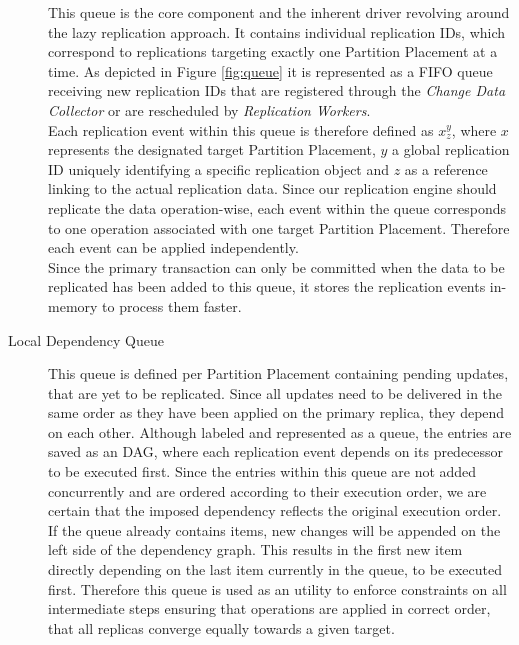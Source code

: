 \begin{description}
    This queue is the core component and the inherent driver revolving around the lazy replication approach. 
    It contains individual replication IDs, which correspond to replications targeting exactly one Partition Placement at a time.
    As depicted in Figure \ref{fig:queue} it is represented as a FIFO queue receiving new replication IDs that are registered through the \emph{Change Data Collector} 
    or are rescheduled by \emph{Replication Workers}.\\
    Each replication event within this queue is therefore defined as $x_{z}^y$, where $x$ represents the designated target Partition Placement, $y$ a global
    replication ID uniquely identifying a specific replication object and $z$ as a reference linking to the actual replication data. 
    Since our replication engine should replicate the data operation-wise, each event within the queue corresponds to one operation associated with one target Partition Placement.
    Therefore each event can be applied independently.\\Since the primary transaction can only be committed when the data to be replicated has been added to this queue,
    it stores the replication events in-memory to process them faster.

  
    \item[Local Dependency Queue] This queue is defined per Partition Placement containing pending updates, that are yet to be replicated. 
    Since all updates need to be delivered in the same order as they have been applied on the primary replica, they depend on each other. 
    Although labeled and represented as a queue, the entries are saved as an DAG, where each replication event depends on its predecessor to be executed first.
    Since the entries within this queue are not added concurrently and are ordered according to their execution order, we are certain that the imposed dependency
    reflects the original execution order. If the queue already contains items, new changes will be appended on the left side of the dependency graph. 
    This results in the first new item directly depending on the last item currently in the queue, to be executed first. 
    Therefore this queue is used as an utility to enforce constraints on all intermediate steps ensuring that operations are applied 
    in correct order, that all replicas converge equally towards a given target. 



\end{description}
